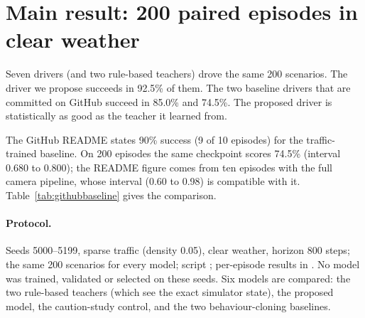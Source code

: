 \section{Main result: 200 paired episodes in clear weather}\label{sec:headline}

\begin{plainwords}
Seven drivers (and two rule-based teachers) drove the same 200 scenarios. The driver we propose succeeds in 92.5\% of them. The two baseline drivers that are committed on GitHub succeed in 85.0\% and 74.5\%. The proposed driver is statistically as good as the teacher it learned from.
\end{plainwords}
\begin{cautionbox}
The GitHub README states 90\% success (9 of 10 episodes) for the traffic-trained baseline. On 200 episodes the same checkpoint scores 74.5\% (interval 0.680 to 0.800); the README figure comes from ten episodes with the full camera pipeline, whose interval (0.60 to 0.98) is compatible with it. Table~\ref{tab:githubbaseline} gives the comparison.
\end{cautionbox}


\paragraph{Protocol.} Seeds 5000--5199, sparse traffic (density 0.05), clear weather, horizon 800 steps; the same 200 scenarios for every model; script ; per-episode results in .
No model was trained, validated or selected on these seeds. Six models are compared: the two rule-based teachers (which see the exact simulator state), the proposed model, the caution-study control, and the two behaviour-cloning baselines.



\begin{table}[H]\centering\small
\caption{Result table for the 200 clear-weather episodes (95\% Wilson intervals; ``Left road'' includes leaving the planned route; energy is the estimate of Section~\ref{sec:setup}).}\label{tab:headline}
\resizebox{\textwidth}{!}{}
\end{table}

